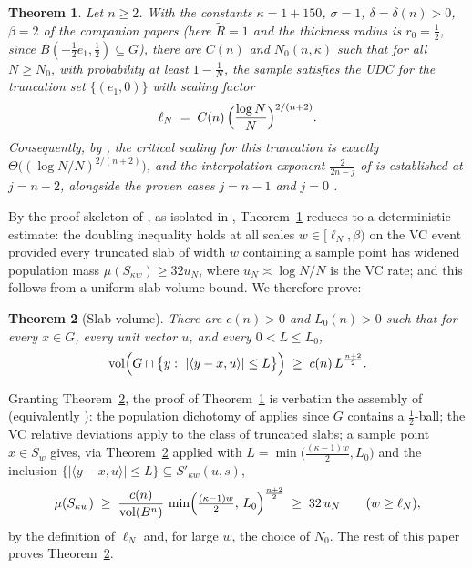 \documentclass[11pt]{article}
\newtheorem{theorem}{Theorem}[section]
\newcommand{\vol}{\operatorname{vol}}
\begin{document}
\begin{theorem}\label{thm:main}
Let $n\ge2$.  With the constants
$\kappa=1+150$, $\sigma=1$, $\delta=\delta(n)>0$, $\beta=2$ of the companion
papers (here $\widetilde R=1$ and the thickness radius is
$r_0=\tfrac12$, since $B(-\tfrac12e_1,\tfrac12)\subseteq G$), there are
$C(n)$ and $N_0(n,\kappa)$ such that for all $N\ge N_0$, with probability at
least $1-\frac1N$, the sample satisfies the UDC for the truncation set
$\{(e_1,0)\}$ with scaling factor
\[
\ell_N\;=\;C(n)\,\Bigl(\frac{\log N}{N}\Bigr)^{2/(n+2)} .
\]
Consequently, by \cite{companion6}, the critical scaling for this truncation
is exactly $\Theta\bigl((\log N/N)^{2/(n+2)}\bigr)$, and the interpolation
exponent $\frac{2}{2n-j}$ of \cite[Conjecture 1.2]{companion6} is established
at $j=n-2$, alongside the proven cases $j=n-1$
\cite{companion3,companion4} and $j=0$ \cite{companion3,companion5}.
\end{theorem}

By the proof skeleton of \cite{companion2}, as isolated in
\cite[Section 2]{companion3}, Theorem~\ref{thm:main} reduces to a
deterministic estimate: the doubling inequality holds at all scales
$w\in[\ell_N,\beta)$ on the VC event provided every truncated slab of width
$w$ containing a sample point has widened population mass
$\mu(S_{\kappa w})\ge32u_N$, where $u_N\asymp\log N/N$ is the VC rate; and
this follows from a uniform slab-volume bound.  We therefore prove:

\begin{theorem}[Slab volume]\label{thm:slab}
There are $c(n)>0$ and $L_0(n)>0$ such that for every $x\in G$, every unit
vector $u$, and every $0<L\le L_0$,
\[
\vol\Bigl(G\cap\bigl\{y:\ |\langle y-x,u\rangle|\le L\bigr\}\Bigr)
\;\ge\;c(n)\,L^{\frac{n+2}2} .
\]
\end{theorem}

Granting Theorem~\ref{thm:slab}, the proof of Theorem~\ref{thm:main} is
verbatim the assembly of \cite[Proof of Theorem 1.2]{companion3} (equivalently
\cite[Section 3]{companion4}): the population dichotomy of
\cite{companion2} applies since $G$ contains a $\tfrac12$-ball; the VC
relative deviations apply to the class of truncated slabs; a sample point
$x\in S_w$ gives, via Theorem~\ref{thm:slab} applied with
$L=\min\bigl(\tfrac{(\kappa-1)w}2,L_0\bigr)$ and the inclusion
$\{|\langle y-x,u\rangle|\le L\}\subseteq S'_{\kappa w}(u,s)$,
\[
\mu(S_{\kappa w})\;\ge\;\frac{c(n)}{\vol(B^n)}\,
\min\Bigl(\tfrac{(\kappa-1)w}2,\,L_0\Bigr)^{\frac{n+2}2}
\;\ge\;32\,u_N
\qquad(w\ge\ell_N),
\]
by the definition of $\ell_N$ and, for large $w$, the choice of $N_0$.  The
rest of this paper proves Theorem~\ref{thm:slab}.
\end{document}
